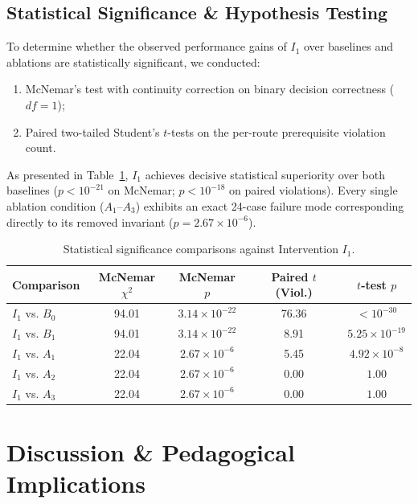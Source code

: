 \documentclass[11pt,a4paper]{article}
\begin{document}
\subsection{Statistical Significance \& Hypothesis Testing}
To determine whether the observed performance gains of $I_1$ over baselines and ablations are statistically significant, we conducted:
\begin{enumerate}
    \item McNemar's test with continuity correction on binary decision correctness ($df = 1$);
    \item Paired two-tailed Student's $t$-tests on the per-route prerequisite violation count.
\end{enumerate}

As presented in Table~\ref{tab:significance}, $I_1$ achieves decisive statistical superiority over both baselines ($p < 10^{-21}$ on McNemar; $p < 10^{-18}$ on paired violations). Every single ablation condition ($A_1$--$A_3$) exhibits an exact 24-case failure mode corresponding directly to its removed invariant ($p = 2.67 \times 10^{-6}$).

\begin{table}[ht]
\centering
\small
\caption{Statistical significance comparisons against Intervention $I_1$.}
\label{tab:significance}
\begin{tabular}{lcccc}
\toprule
\textbf{Comparison} & \textbf{McNemar $\chi^2$} & \textbf{McNemar $p$} & \textbf{Paired $t$ (Viol.)} & \textbf{$t$-test $p$} \\
\midrule
$I_1$ vs. $B_0$ & 94.01 & $3.14 \times 10^{-22}$ & 76.36 & $< 10^{-30}$ \\
$I_1$ vs. $B_1$ & 94.01 & $3.14 \times 10^{-22}$ & 8.91 & $5.25 \times 10^{-19}$ \\
$I_1$ vs. $A_1$ & 22.04 & $2.67 \times 10^{-6}$ & 5.45 & $4.92 \times 10^{-8}$ \\
$I_1$ vs. $A_2$ & 22.04 & $2.67 \times 10^{-6}$ & 0.00 & $1.00$ \\
$I_1$ vs. $A_3$ & 22.04 & $2.67 \times 10^{-6}$ & 0.00 & $1.00$ \\
\bottomrule
\end{tabular}
\end{table}

\section{Discussion \& Pedagogical Implications}
\end{document}

